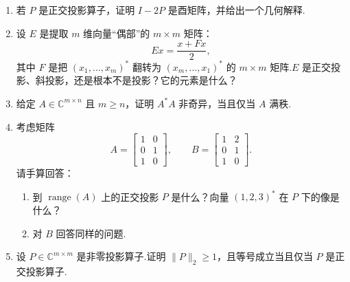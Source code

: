 \documentclass[UTF8,fontset=none,12pt]{ctexart}
\newcommand{\C}{\mathbb{C}}
\newcommand{\range}{\operatorname{range}}
\theoremstyle{definition}
\begin{document}
\begin{enumerate}[label=\textbf{6.\arabic*.},leftmargin=*]
    \item 若 $P$ 是正交投影算子，证明 $I-2P$ 是酉矩阵，并给出一个几何解释.
    \item 设 $E$ 是提取 $m$ 维向量“偶部”的 $m\times m$ 矩阵：
    \[
        Ex=\frac{x+Fx}{2},
    \]
    其中 $F$ 是把 $(x_1,\ldots,x_m)^*$ 翻转为 $(x_m,\ldots,x_1)^*$ 的 $m\times m$ 矩阵.$E$ 是正交投影、斜投影，还是根本不是投影？它的元素是什么？
    \item 给定 $A\in\C^{m\times n}$ 且 $m\ge n$，证明 $A^*A$ 非奇异，当且仅当 $A$ 满秩.
    \item 考虑矩阵
    \[
        A=\begin{bmatrix}1&0\\0&1\\1&0\end{bmatrix},
        \qquad
        B=\begin{bmatrix}1&2\\0&1\\1&0\end{bmatrix}.
    \]
    请手算回答：
    \begin{enumerate}[label=(\alph*),leftmargin=2em]
        \item 到 $\range(A)$ 上的正交投影 $P$ 是什么？向量 $(1,2,3)^*$ 在 $P$ 下的像是什么？
        \item 对 $B$ 回答同样的问题.
    \end{enumerate}
    \item 设 $P\in\C^{m\times m}$ 是非零投影算子.证明 $\lVert P\rVert_2\ge 1$，且等号成立当且仅当 $P$ 是正交投影算子.
\end{enumerate}
\end{document}
